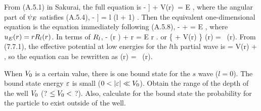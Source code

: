 \begin{solution}
	From (A.5.1) in Sakurai, the full {\Schrodinger} equation is
	\beq
		- \left[ \frac{1}{r^2} \pdv{r} \left( r^2 \pdv{\psiE}{r} \right) + \frac{1}{r^2 \sin\tht} \pdv{\tht} \left( \sin\tht \pdv{\psiE}{\tht} \right) + \frac{1}{r^2 \sin^2\tht} \pdv[2]{\psiE}{\phi} \right] + V(r) \,\psiE = E \psiE,
	\eeq
	where the angular part of $\psi_E$ satisfies (A.5.4),
	\beq
		-\left[ \frac{1}{\sin\tht} \pdv{}{\tht} \left( \sin\tht \pdv{}{\tht} \right) + \frac{1}{\sin^2\tht} \pdv[2]{}{\phi} \right] \Ylm = l (l + 1) \Ylm.
	\eeq
	Then the equivalent one-dimensional {\Schrodinger} equation is the equation immediately following (A.5.8),
	\beqn \label{schrod}
		-  +  \uE = E \uE,
	\eeqn
	where $u_E(r) = r R_l(r)$.  In terms of $R_l$,
	\beq
		-  (r \Rl) +  r \Rl = E r \Rl.
	\eeq
	or
	\beq
		\left\{   + V(r) \right\} \Rl(r) = \El \, \Rl(r).
	\eeq
	From (7.7.1), the effective potential at low energies for the $l$th partial wave is
	\beq
		\Veff = V(r) +  \frac{l (l + 1)}{r^2},
	\eeq
	so the {\Schrodinger} equation can be rewritten as
	\beq
		 \Rl(r) = \El \, \Rl(r).
	\eeq
	\vfix
\end{solution}

\begin{problem} \label{2.2}
	When $V_0$ is a certain value, there is one bound state for the $s$ wave ($l = 0$).  The bound state energy $\varepsilon$ is small ($0 < \abs{\varepsilon} \ll V_0$).  Obtain the range of the depth of the well $V_0$ (? $\leq V_0 <$ ?).  Also, calculate for the bound state the probability for the particle to exist outside of the well.
\end{problem}

